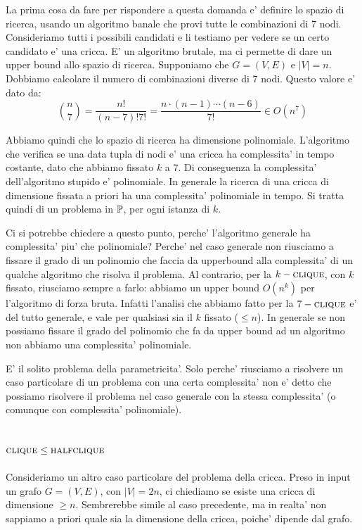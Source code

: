La prima cosa da fare per rispondere a questa domanda e' definire lo spazio di ricerca, usando un
algoritmo banale che provi tutte le combinazioni di 7 nodi. Consideriamo tutti i possibili candidati
e li testiamo per vedere se un certo candidato e' una cricca. E' un algoritmo brutale, ma ci
permette di dare un upper bound allo spazio di ricerca. Supponiamo che $G=(V,E)$ e $|V| = n$.
Dobbiamo calcolare il numero di combinazioni diverse di 7 nodi. Questo valore e' dato da:
\begin{equation*}
    \binom{n}{7} = \frac{n!}{(n-7)!7!} = \frac{n\cdot (n-1) \cdots (n-6)}{7!} \in O(n^{7})
\end{equation*}

Abbiamo quindi che lo spazio di ricerca ha dimensione polinomiale. L'algoritmo che verifica se una
data tupla di nodi e' una cricca ha complessita' in tempo costante, dato che abbiamo fissato $k$ a
$7$. Di conseguenza la complessita' dell'algoritmo stupido e' polinomiale. In generale la ricerca di
una cricca di dimensione fissata a priori ha una complessita' polinomiale in tempo. Si tratta quindi
di un problema in $\mathbb{P}$, per ogni istanza di $k$.

Ci si potrebbe chiedere a questo punto, perche' l'algoritmo generale ha complessita' piu' che
polinomiale? Perche' nel caso generale non riusciamo a fissare il grado di un polinomio che faccia
da upperbound alla complessita' di un qualche algoritmo che risolva il problema. Al contrario, per
la $k-\textsc{clique}$, con $k$ fissato, riusciamo sempre a farlo: abbiamo un upper bound $O(n^{k})$ per
l'algoritmo di forza bruta. Infatti l'analisi che abbiamo fatto per la $7-\textsc{clique}$ e' del tutto
generale, e vale per qualsiasi sia il $k$ fissato ($\leq n$). In generale se non possiamo fissare il
grado del polinomio che fa da upper bound ad un algoritmo non abbiamo una complessita' polinomiale.

E' il solito problema della parametricita'. Solo perche' riusciamo a risolvere un caso particolare
di un problema con una certa complessita' non e' detto che possiamo risolvere il problema nel caso
generale con la stessa complessita' (o comunque con complessita' polinomiale).

\subsection{$\textsc{clique} \leq \textsc{halfclique}$}

Consideriamo un altro caso particolare del problema della cricca. Preso in input un grafo $G=(V,E)$,
con $|V| = 2n$, ci chiediamo se esiste una cricca di dimensione $\geq n$. Sembrerebbe simile al caso
precedente, ma in realta' non sappiamo a priori quale sia la dimensione della cricca, poiche'
dipende dal grafo.

